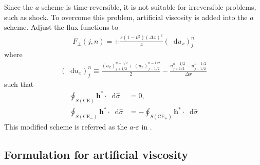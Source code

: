 \documentclass[11pt,dvips]{article}
\numberwithin{equation}{section}
\newcommand{\dif}{\mathop{}\!\mathrm{d}}
\begin{document}
Since the $a$ scheme is time-reversible, it is not suitable for irreversible
problems, such as shock.  To overcome this problem, artificial viscosity is
added into the $a$ scheme.  Adjust the flux functions to
\begin{align}
  F_{\pm}(j,n) = \pm\frac{\varepsilon(1-\nu^2)(\Delta x)^2}{4}(\dif u_x)_j^n
    \label{e:aeconserv}
\end{align}
where
\begin{align*}
  (\dif u_x)_j^n \equiv
    \frac{(u_x)_{j+1/2}^{n-1/2} + (u_x)_{j-1/2}^{n-1/2}}{2}
  - \frac{u_{j+1/2}^{n-1/2} - u_{j-1/2}^{n-1/2}}{\Delta x}
\end{align*}
such that
\begin{align*}
    \oint_{S(\mathrm{CE}  )}\mathbf{h}^*\cdot \dif\hat{\sigma} &= 0, \\
    \oint_{S(\mathrm{CE}_-)}\mathbf{h}^*\cdot \dif\hat{\sigma} &=
  - \oint_{S(\mathrm{CE}_+)}\mathbf{h}^*\cdot \dif\hat{\sigma}
\end{align*}
This modified scheme is referred as the $a$-$\varepsilon$ in
\citep[][Section 3]{chang_method_1995}.

\subsection{Formulation for artificial viscosity}
\end{document}

